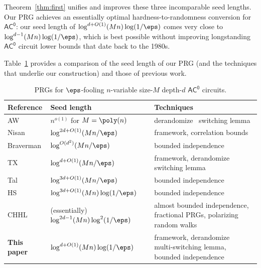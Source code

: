 \documentclass{toc}
\theoremstyle{plain}
\newcommand{\acz}{\mathsf{AC^0}}
\begin{document}
Theorem~\ref{thm:first} unifies and improves these three incomparable seed lengths.  Our PRG  achieves an essentially optimal
%
hardness-to-randomness  %
conversion for $\acz$: our seed length of $\log^{d+O(1)}(Mn) \log(1/\eps)$ comes very close to $\log^{d-1}(Mn)\log(1/\eps)$, which is best possible without improving longstanding $\acz$ circuit lower bounds that date back to the 1980s.
%
%

%
%
%

Table~\ref{table:ac0} provides a comparison of the seed length of our PRG (and the techniques that underlie our construction) and those of previous work. 



\begin{table}[h]
\renewcommand{\arraystretch}{1.6}
\centering
\begin{tabular}{|m{7em}|m{11em}|m{21em}|}
\hline
 Reference &  Seed length & Techniques \\ \hline
\cite{AjtaiWigderson:85} AW & $n^{o(1)}$ for $M=\poly(n)$  & derandomize~\cite{ajtai1983} switching lemma \\ \hline
\cite{Nis91}  Nisan &  $\log^{2d+O(1)}(Mn/\eps)$ & \cite{NW94} framework, \cite{Hastad86} correlation bounds \\ \hline
\cite{Bra10} Braverman & $\log^{O(d^2)}(Mn/\eps)$ & bounded independence\\ \hline 
%
%
\cite{TX13} TX & $\log^{d+O(1)}(Mn/\eps)$ & \cite{AjtaiWigderson:85} framework, derandomize~\cite{Hastad86} switching lemma\\ \hline  
\cite{Tal:15tightbounds} Tal & $\log^{3d+O(1)}(Mn/\eps)$ & bounded independence \\ \hline
\cite{HS16journal} HS & $\log^{3d+O(1)}(Mn)  \log(1/\eps)$ & bounded independence 
\\ \hline
\cite{CHHL18journal} CHHL & (essentially) $\log^{2d-1}(Mn)  \log^2(1/\eps)$ & almost bounded independence, fractional PRGs, polarizing random walks
\\ \hline \hline
%
{\bf This paper}  %
& $\log^{d+O(1)}(Mn) \log(1/\eps)$ & \cite{AjtaiWigderson:85} framework, derandomize~\cite{Has14} multi-switching lemma,
bounded independence\\ \hline
 \end{tabular}
 \caption{PRGs for $\eps$-fooling $n$-variable size-$M$ depth-$d$ $\acz$ circuits.}
 \label{table:ac0}
 \end{table}
 
 
 
%
%
%
%
%
%
%
%
%
%
%
%
%
%
%
%
\end{document}
